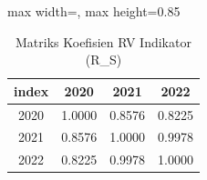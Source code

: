 \begin{table}[H]
\centering
\caption{Matriks Koefisien RV Indikator (R_S)} \label{tab:samplerv_s}
\begin{adjustbox}{max width=\textwidth, max height=0.85\textheight}
\begin{tabular}{|c|c|c|c|}
\hline
\textbf{index} & \textbf{2020} & \textbf{2021} & \textbf{2022} \\
\hline
2020 & 1.0000 & 0.8576 & 0.8225 \\
2021 & 0.8576 & 1.0000 & 0.9978 \\
2022 & 0.8225 & 0.9978 & 1.0000 \\
\hline
\end{tabular}
\end{adjustbox}
\end{table}